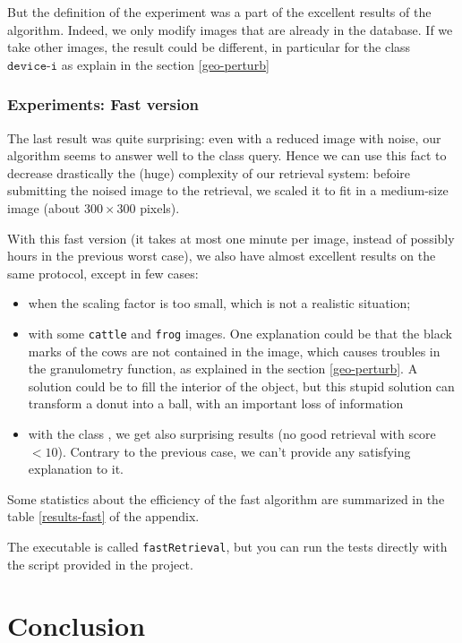 But the definition of the experiment was a part of the excellent results of the algorithm. Indeed, we only modify images that are already in the database. If we take other images, the result could be different, in particular for the class $\texttt{device-i}$ as explain in the section \ref{geo-perturb}

\subsubsection{Experiments: Fast version}

The last result was quite surprising: even with a reduced image with noise, our algorithm seems to answer well to the class query. Hence we can use this fact to decrease drastically the (huge) complexity of our retrieval system: befoire submitting the noised image to the retrieval, we scaled it to fit in a medium-size image (about $300\times300$ pixels).

With this fast version (it takes at most one minute per image, instead of possibly hours in the previous worst case), we also have almost excellent results on the same protocol, except in few cases:
\begin{itemize}
 \item when the scaling factor is too small, which is not a realistic situation;
 \item with some \texttt{cattle} and \texttt{frog} images. One explanation could be that the black marks of the cows are not contained in the image, which causes troubles in the granulometry function, as explained in the section \ref{geo-perturb}. A solution could be to fill the interior of the object, but this stupid solution can transform a donut into a ball, with an important loss of information
 \item with the class , we get also surprising results (no good retrieval with score $< 10$). Contrary to the previous case, we can't provide any satisfying explanation to it.
\end{itemize}

Some statistics about the efficiency of the fast algorithm are summarized in the table \ref{results-fast} of the appendix.

The executable is called \texttt{fastRetrieval}, but you can run the tests directly with the script provided in the project.


\section*{Conclusion}

